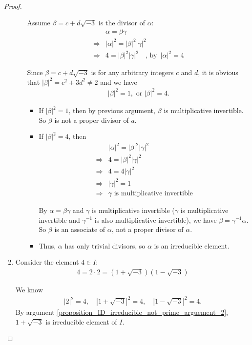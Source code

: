 \documentclass[utf8]{ctexbook}
\theoremstyle{definition}
\begin{document}
\begin{proof}
\begin{enumerate}
\begin{itemize}
{Assume $\beta = c + d \sqrt{-3}$ is the divisor of $\alpha $:
\begin{align*}
& \alpha = \beta \gamma \\
\Longrightarrow & |\alpha |^2 = |\beta |^2 | \gamma |^2 \\
\Longrightarrow & 4 =  |\beta |^2 | \gamma |^2 \quad \mbox{, by } \, |\alpha |^2 = 4
\end{align*}

Since $\beta = c + d \sqrt{-3}$ is for any arbitrary integers $c$ and $d$, it is obvious that
$|\beta |^2 = c^2 + 3 d^2 \neq 2 $ and we have 
\begin{align*}
|\beta |^2 = 1, \mbox{ or } |\beta |^2 = 4 .
\end{align*}

\begin{itemize}
\item{If $|\beta |^2 = 1$, then by previous argument, $\beta$ is multiplicative invertible. So $\beta$ is not a proper divisor of $a$.}
\item{If $|\beta |^2 = 4 $, then 
\begin{align*}
& |\alpha |^2 = |\beta |^2 | \gamma |^2 \\
\Longrightarrow & 4 =  |\beta |^2 | \gamma |^2  \\
\Longrightarrow & 4 = 4 | \gamma |^2  \\
\Longrightarrow & | \gamma |^2 = 1 \\
\Longrightarrow & \gamma \mbox{ is multiplicative invertible}
\end{align*}

By $\alpha = \beta \gamma $ and $\gamma$ is multiplicative invertible ($\gamma$ is multiplicative invertible and $\gamma^{-1}$ is also multiplicative invertible), we have $\beta = \gamma^{-1} \alpha$. So $\beta$ is an associate of $\alpha$, not a proper divisor of $\alpha$.
}
\item{ Thus, $\alpha $ has only trivial divisors, so $\alpha$ is an irreducible element.}
\end{itemize}

}
\end{itemize}
\item{Consider the element $ 4 \in I$:
\begin{align}
4 = 2 \cdot 2 = (1+ \sqrt{-3} ) (1 - \sqrt{-3}) \label{proposition_ID_irreducible_not_prime_eq_1}
\end{align}

We know
\begin{align*}
|2|^2 = 4, \quad |1 + \sqrt{-3}|^2 = 4, \quad |1 - \sqrt{-3}|^2 = 4 .
\end{align*}
By argument \ref{proposition_ID_irreducible_not_prime_arguement_2}, $ 1 + \sqrt{-3} $ is irreducible element of $I$.

}
\end{enumerate}
\end{proof}
\end{document}
